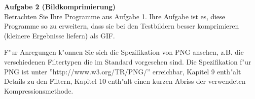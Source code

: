 \documentclass[a4paper]{article}
\begin{document}
\bigskip

{\bf Aufgabe 2  \quad(Bildkomprimierung)}\\
Betrachten Sie Ihre Programme aus Aufgabe 1. Ihre Aufgabe ist es, diese
Programme so zu erweitern, dass sie bei den Testbildern besser komprimieren
(kleinere Ergebnisse liefern) als GIF.

F"ur Anregungen k"onnen Sie sich die Spezifikation von PNG ansehen, z.B. die
verschiedenen Filtertypen die im Standard vorgesehen sind. Die Spezifikation
f"ur PNG ist unter ''http://www.w3.org/TR/PNG/'' erreichbar, Kapitel 9 enth"alt
Details zu den Filtern, Kapitel 10 enth"alt einen kurzen Abriss der verwendeten
Kompressionsmethode.
\end{document}
